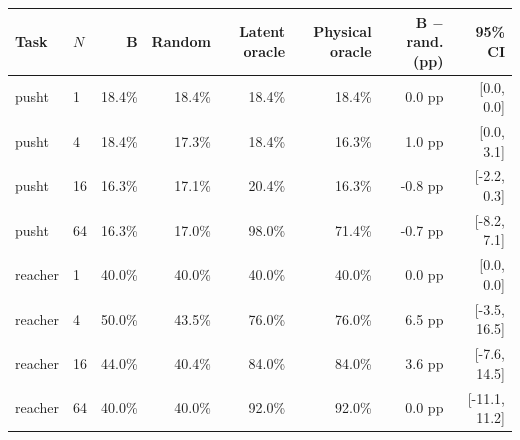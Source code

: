 \begin{tabular}{llrrrrrr}
\toprule
Task & $N$ & B & Random & Latent oracle & Physical oracle & B $-$ rand. (pp) & 95\% CI \\
\midrule
pusht & 1 & 18.4\% & 18.4\% & 18.4\% & 18.4\% & 0.0 pp & [0.0, 0.0] \\
pusht & 4 & 18.4\% & 17.3\% & 18.4\% & 16.3\% & 1.0 pp & [0.0, 3.1] \\
pusht & 16 & 16.3\% & 17.1\% & 20.4\% & 16.3\% & -0.8 pp & [-2.2, 0.3] \\
pusht & 64 & 16.3\% & 17.0\% & 98.0\% & 71.4\% & -0.7 pp & [-8.2, 7.1] \\
reacher & 1 & 40.0\% & 40.0\% & 40.0\% & 40.0\% & 0.0 pp & [0.0, 0.0] \\
reacher & 4 & 50.0\% & 43.5\% & 76.0\% & 76.0\% & 6.5 pp & [-3.5, 16.5] \\
reacher & 16 & 44.0\% & 40.4\% & 84.0\% & 84.0\% & 3.6 pp & [-7.6, 14.5] \\
reacher & 64 & 40.0\% & 40.0\% & 92.0\% & 92.0\% & 0.0 pp & [-11.1, 11.2] \\
\bottomrule
\end{tabular}
